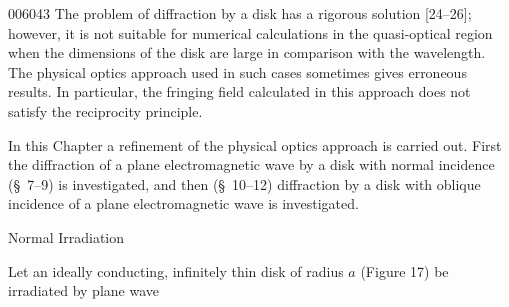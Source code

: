 \begin{scanpage}{0060}{43}
The problem of diffraction by a disk has a rigorous solution [24--26]; however, it is not suitable for numerical calculations in the quasi-optical region when the dimensions of the disk are large in comparison with the wavelength. The physical optics approach used in such cases sometimes gives erroneous results. In particular, the fringing field calculated in this approach does not satisfy the reciprocity principle.

In this Chapter a refinement of the physical optics approach is carried out. First the diffraction of a plane electromagnetic wave by a disk with normal incidence (\S\ 7--9) is investigated, and then (\S\ 10--12) diffraction by a disk with oblique incidence of a plane electromagnetic wave is investigated.
\begin{center}Normal Irradiation\end{center}
Let an ideally conducting, infinitely thin disk of radius $a$ (Figure 17) be irradiated by plane wave
\end{scanpage}
